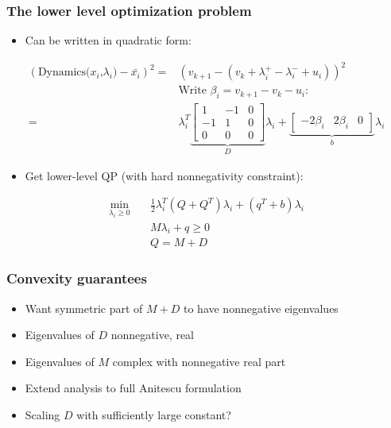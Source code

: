 \documentclass{beamer}
\begin{document}
\begin{frame}
    \frametitle{The lower level optimization problem}

    \begin{itemize}
        \item Can be written in quadratic form:
    \end{itemize}
\begin{align*}
    (\textrm{Dynamics($x_i$,$\lambda_i$)} - \bar{x_i})^2 = &\left(v_{k + 1} - (v_k + \lambda^+_i - \lambda^-_i + u_i)\right)^2 \\
  &\textrm{Write $\beta_i = v_{k+1} - v_k - u_i$: } \\
    = &\lambda_i^T 
        \underbrace{
            \begin{bmatrix} 1 & -1 & 0 \\ -1 & 1 & 0 \\ 0 & 0 & 0 \end{bmatrix} 
        }_D
        \lambda_i + \underbrace{
            \begin{bmatrix} -2 \beta_i & 2 \beta_i & 0 \end{bmatrix}
        }_b  \lambda_i 
\end{align*}
    
    \begin{itemize}
        \item Get lower-level QP (with hard nonnegativity constraint):
    \end{itemize}
    \begin{align*}
        \min _{\lambda_i \geq 0} \quad & \frac{1}{2} \lambda_i^T (Q + Q^T)  \lambda_i + (q^T + b) \lambda_i \\
                                       &M \lambda_i + q \geq 0 \\
                                       & Q = M + D
    \end{align*}
\end{frame}

\begin{frame}
    \frametitle{Convexity guarantees}
    \begin{itemize}
        \item Want symmetric part of $M + D$ to have nonnegative eigenvalues
        \item Eigenvalues of $D$ nonnegative, real
        \item Eigenvalues of $M$ complex with nonnegative real part
        \item Extend analysis to full Anitescu formulation
        \item Scaling $D$ with sufficiently large constant?
    \end{itemize}
\end{frame}
\end{document}
